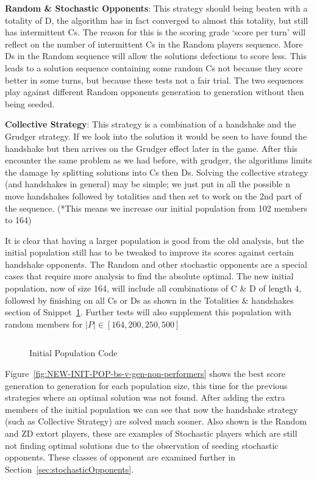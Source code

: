 \textbf{Random \& Stochastic Opponents}: This strategy should being beaten with a totality of D, the algorithm has in fact converged to almost this totality, but still has intermittent Cs.
The reason for this is the scoring grade `score per turn' will reflect on the number of intermittent Cs in the Random players sequence.
More Ds in the Random sequence will allow the solutions defections to score less.
This leads to a solution sequence containing some random Cs not because they score better in some turns, but because these tests not a fair trial.
The two sequences play against different Random opponents generation to generation without then being seeded.

\textbf{Collective Strategy}: This strategy is a combination of a handshake and the Grudger strategy.
If we look into the solution it would be seen to have found the handshake but then arrives on the Grudger effect later in the game.
After this encounter the same problem as we had before, with grudger, the algorithms limits the damage by splitting solutions into Cs then Ds.
Solving the collective strategy (and handshakes in general) may be simple;
we just put in all the possible n move handshakes followed by totalities and then set to work on the 2nd part of the sequence.
(*This means we increase our initial population from 102 members to 164)

It is clear that having a larger population is good from the old analysis, but the initial population still has to be tweaked to improve its scores against certain handshake opponents.
The Random and other stochastic opponents are a special cases that require more analysis to find the absolute optimal.
The new initial population, now of size 164, will include all combinations of C \& D of length 4, followed by finishing on all Cs or Ds as shown in the Totalities \& handshakes section of Snippet~\ref{code:initialPopulationCode}.
Further tests will also supplement this population with random members for \(|P| \in [164,200,250,500]\)

\begin{figure}
    \inputminted{python}{code_snippets/initialPopulationCode.py}
    \caption{Initial Population Code}\label{code:initialPopulationCode}
\end{figure}

Figure~\ref{fig:NEW-INIT-POP-bs-v-gen-non-performers} shows the best score generation to generation for each population size, this time for the previous strategies where an optimal solution was not found.
After adding the extra members of the initial population we can see that now the handshake strategy (such as Collective Strategy) are solved much sooner.
Also shown is the Random and ZD extort players, these are examples of Stochastic players which are still not finding optimal solutions due to the observation of seeding stochastic opponents.
These classes of opponent are examined further in Section~\ref{sec:stochasticOpponents}.

